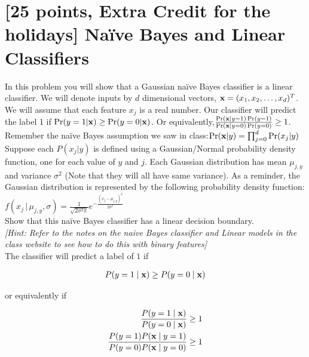 \section{[25 points, Extra Credit for the holidays] Na\"ive Bayes and Linear Classifiers }
\label{sec:q1}


In this problem you will show that a Gaussian na\"ive Bayes classifier is a linear classifier. We will denote inputs by $d$ dimensional vectors, ${\bf x} = (x_1, x_2,\dots, x_d)^T$. We will assume that each feature $x_j$ is a real number. Our classifier will predict the label 1 if $\Pr(y=1|{\bf x}) \geq \Pr(y=0|{\bf x})$. Or equivalently,$\frac{\Pr({\bf x} | y=1)\Pr(y=1)}{\Pr({\bf x} | y=0)\Pr(y=0)} \geq 1$. Remember the na\"ive Bayes assumption we saw in class:$\Pr({\bf x}|y) = \prod_{j=0}^{d}\Pr(x_j|y)$\\

Suppose each $P(x_j|y)$ is defined using a Gaussian/Normal probability density function, one for each value of $y$ and $j$. Each Gaussian distribution has mean $\mu_{j,y}$ and variance $\sigma^2$ (Note that they will all have same variance). As a reminder, the Gaussian distribution is represented by the following probability density function:$f(x_j\,|\,\mu_{j,y}, \sigma) = \frac{1}{\sqrt{2\sigma^2\pi}}e^{-\frac{(x_j-\mu_{j,y})^2}{2\sigma^2}}$\\

Show that this na\"ive Bayes classifier has a linear decision boundary.\\ \textit{[Hint: Refer to the notes on the naive Bayes classifier and Linear models in the class website to see how to do this with binary features]}\\

The classifier will predict a label of $1$ if 

\begin{equation*}
\begin{aligned}
P(y=1 \mid {\bf x}) \geq P(y=0 \mid {\bf x})
\end{aligned}
\end{equation*}

or equivalently if

\begin{equation*}
\begin{aligned}
\frac{P(y=1 \mid {\bf x}) }{ P(y=0 \mid {\bf x})} \geq 1\\
\frac{P(y=1) P({\bf x}  \mid y=1) }{ P(y=0) P({\bf x} \mid y=0)} \geq 1
\end{aligned}
\end{equation*}

